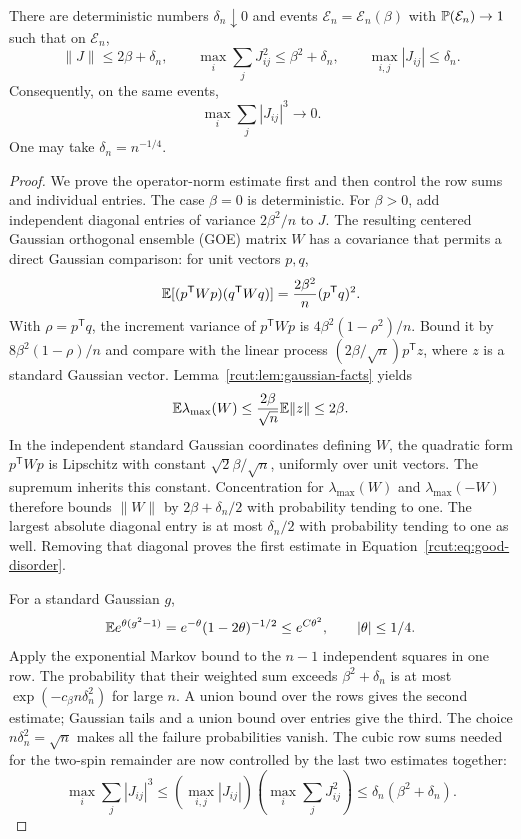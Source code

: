 \begin{proposition}
\label{rcut:prop:good-disorder}
There are deterministic numbers $\delta_n\downarrow0$ and events
$\mathcal E_n=\mathcal E_n(\beta)$ with $\P(\mathcal E_n)\to1$ such that
on $\mathcal E_n$,
\begin{equation}
 \|J\|\le2\beta+\delta_n,
 \qquad \max_i\sum_jJ_{ij}^2\le\beta^2+\delta_n,
 \qquad \max_{i,j}|J_{ij}|\le\delta_n.
 \label{rcut:eq:good-disorder}
\end{equation}
Consequently, on the same events,
\[
 \max_i\sum_j|J_{ij}|^3\longrightarrow0.
\]
One may take $\delta_n=n^{-1/4}$.
\end{proposition}

\begin{proof}
We prove the operator-norm estimate first and then control the row sums
and individual entries.  The case $\beta=0$ is deterministic.  For
$\beta>0$, add independent diagonal entries of variance $2\beta^2/n$ to
$J$.  The resulting centered Gaussian orthogonal ensemble (GOE) matrix
$W$ has a covariance that permits a direct Gaussian comparison: for unit
vectors $p,q$,
\[
 \E[(p^{\mathsf T}Wp)(q^{\mathsf T}Wq)]
 =\frac{2\beta^2}{n}(p^{\mathsf T}q)^2.
\]
With $\rho=p^{\mathsf T}q$, the increment variance of $p^{\mathsf T}Wp$ is
$4\beta^2(1-\rho^2)/n$.  Bound it by $8\beta^2(1-\rho)/n$ and compare
with the linear process $(2\beta/\sqrt n)p^{\mathsf T}z$, where $z$ is
a standard Gaussian vector.  Lemma~\ref{rcut:lem:gaussian-facts} yields
\[
 \E\lambda_{\max}(W)
 \le\frac{2\beta}{\sqrt n}\E\|z\|\le2\beta.
\]
In the independent standard Gaussian coordinates defining $W$, the
quadratic form $p^{\mathsf T}Wp$ is Lipschitz with constant
$\sqrt2\beta/\sqrt n$, uniformly over unit vectors.  The supremum inherits
this constant.  Concentration for $\lambda_{\max}(W)$ and
$\lambda_{\max}(-W)$ therefore bounds $\|W\|$ by $2\beta+\delta_n/2$
with probability tending to one.  The largest absolute diagonal entry is
at most $\delta_n/2$ with probability tending to one as well.  Removing
that diagonal proves the first estimate in
Equation~\eqref{rcut:eq:good-disorder}.

For a standard Gaussian $g$,
\[
 \E e^{\theta(g^2-1)}=e^{-\theta}(1-2\theta)^{-1/2}
 \le e^{C\theta^2},\qquad |\theta|\le1/4.
\]
Apply the exponential Markov bound to the $n-1$ independent squares in
one row.  The probability that their weighted sum exceeds
$\beta^2+\delta_n$ is at most $\exp(-c_\beta n\delta_n^2)$ for large $n$.
A union bound over the rows gives the second estimate; Gaussian tails
and a union bound over entries give the third.  The choice
$n\delta_n^2=\sqrt n$ makes all the failure probabilities vanish.
The cubic row sums needed for the two-spin remainder are now controlled
by the last two estimates together:
\[
 \max_i\sum_j|J_{ij}|^3
 \le \left(\max_{i,j}|J_{ij}|\right)
       \left(\max_i\sum_jJ_{ij}^2\right)
 \le\delta_n(\beta^2+\delta_n).
\]
\end{proof}

